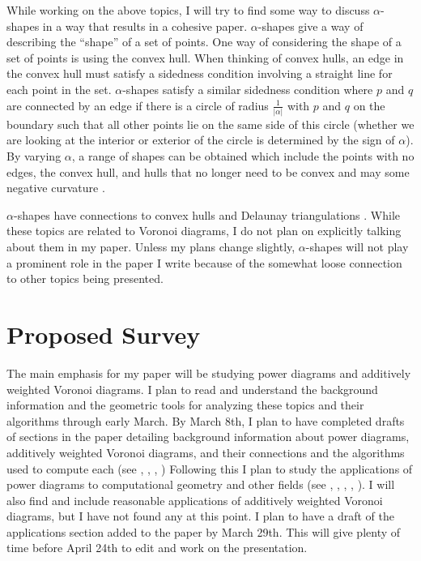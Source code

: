 \documentclass[a4paper]{article}
\begin{document}
While working on the above topics, I will try to find some way to discuss $\alpha$-shapes in a way that results in a cohesive paper. $\alpha$-shapes give
a way of describing the ``shape'' of a set of points. One way of considering the shape of a set of points is using the convex hull. When thinking of
convex hulls, an edge in the convex hull must satisfy a sidedness condition involving a straight line for each point in the set. $\alpha$-shapes satisfy a similar sidedness condition
where $p$ and $q$ are connected by an edge if there is a circle of radius $\frac{1}{|\alpha|}$ with $p$ and $q$ on the boundary such that all other
points lie on the same side of this circle (whether we are looking at the interior or exterior of the circle is determined by the sign of $\alpha$). By
varying $\alpha$, a range of shapes can be obtained which include the points with no edges, the convex hull, and hulls that no longer need to be
convex and may some negative curvature \cite{edelsbrunner_3d} \cite{edelsbrunner_alpha}.

$\alpha$-shapes have connections to convex hulls and Delaunay triangulations \cite{edelsbrunner_alpha}. While these topics are related to Voronoi
diagrams, I do not plan on explicitly talking about them in my paper. Unless my plans change slightly, $\alpha$-shapes will not play a prominent role
in the paper I write because of the somewhat loose connection to other topics being presented.

\section{Proposed Survey}

The main emphasis for my paper will be studying power diagrams and additively weighted Voronoi diagrams. I plan to read and understand the background
information and the geometric tools for analyzing these topics and their algorithms through early March. By March 8th, I plan to have completed drafts
of sections in the paper detailing background information about power diagrams, additively weighted Voronoi diagrams, and their connections and the
algorithms used to compute each (see \cite{aurenhammer_power}, \cite{aurenhammer_survey}, \cite{aurenhammer_additive}, \cite{fortune_sweepline})
Following this I plan to study the applications of power diagrams to computational geometry and other fields (see \cite{aurenhammer_discs}, \cite{brieden_clustering},
\cite{brieden_farmland}, \cite{imai_power}, \cite{fluids}). I will also find and include reasonable applications of additively weighted Voronoi
diagrams, but I have not found any at this point. I plan to have a draft of the applications section added to the paper by March 29th. This
will give plenty of time before April 24th to edit and work on the presentation.

\printbibliography
\end{document}
